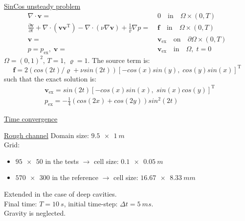 \documentclass{beamer}
\begin{document}
\begin{frame}[label=timeconvSupp]{\hyperlink{timeconv}{SinCos unsteady problem}}
\begin{align*}
\nabla \cdot \mathbf{v} =& \; 0 \quad \text{in} \quad \Omega \times (0,T)\\
\frac{\partial \mathbf{v}}{\partial t} + \nabla \cdot ( \mathbf{v} 
\mathbf{v^\mathrm{T}}) - \nabla \cdot (\nu \nabla \mathbf{v}) + 
\frac{1}{\varrho} \nabla p =& \; \mathbf{f} \quad \text{in} \quad \Omega 
\times (0,T)\\
\mathbf{v} =& \; \mathbf{v}_\text{ex} \quad \text{on} \quad \partial \Omega 
\times (0,T)
\\p=p_\text{ex},\;\mathbf{v} =&\; \mathbf{v}_\text{ex} \quad \text{in} \quad 
\Omega, \; t=0
\end{align*}
$\Omega = (0,1)^2$, $T=1$, $\varrho = 1$. The source term is:
\begin{equation*}
\mathbf{f} = 2(cos(2t)/\varrho +\nu sin(2t))[-cos(x) sin(y), \; cos(y) 
sin(x)]^\mathrm{T}
\end{equation*}
such that the exact solution is:
\begin{align*}
&\mathbf{v}_\text{ex} = sin(2t)[-cos(x) sin(x), \; sin(x) cos(y)]^\mathrm{T}\\
&p_\text{ex} = -\frac{1}{4} (cos(2x)+cos(2y))sin^2(2t)
\end{align*}
\end{frame}
\begin{frame}{\hyperlink{timeconv}{Time convergence}}
\vspace{-0.8cm}
	\begin{figure}
		\centering
		\subfloat[Pressure]{\hspace{-1cm}}
		\subfloat[Velocity]{}
	\end{figure}
\end{frame}
\begin{frame}[label=roughSupp]{\hyperlink{rough}{Rough channel}}
Domain size: $\SI{9.5x1}{m}$\\[\baselineskip]
Grid:
\begin{itemize}
	\item $\num{95x50}$ in the tests $\rightarrow$ cell size: 
	$\SI{0.1x0.05}{m}$
	\item $\num{570x300}$ in the reference $\rightarrow$ cell size: 
	$\SI{16.67x8.33}{mm}$
\end{itemize}
Extended in the case of deep cavities.\\[\baselineskip]
Final time: $T=\SI{10}{s}$, initial time-step: $\Delta 
t=\SI{5}{ms}$.\\[\baselineskip]
Gravity is neglected.
\end{frame}
\end{document}
